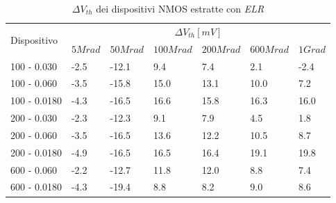\documentclass[
	a4paper,
	cleardoublepage=empty,
	headings=twolinechapter,
	numbers=autoenddot,
]{scrbook}
\begin{document}
\begin{table}[H]
  \renewcommand{\arraystretch}{1.3}
  \begin{tabular}{m{2.1cm}  m{1.1cm} m{1.3cm} m{1.5cm} m{1.5cm} m{1.5cm} m{1cm}}
    \toprule
    \multirow{2}{*}{Dispositivo} & \multicolumn{6}{c}{$\Delta V_{th} [mV] $}                                                          \\
    \cmidrule{2-7}
                                 & $5Mrad$                                   & $50Mrad$ & $100Mrad$ & $200Mrad$ & $600Mrad$ & $1Grad$ \\
    \midrule
    100 - 0.030                     & -2.5                                      & -12.1    & 9.4       & 7.4       & 2.1       & -2.4        \\
    \hline
    100 - 0.060                     & -3.5                                      & -15.8    & 15.0      & 13.1      & 10.0      & 7.2        \\
    \hline
    100 - 0.0180                    & -4.3                                      & -16.5    & 16.6      & 15.8      & 16.3      & 16.0        \\
    \hline
    200 - 0.030                     & -2.3                                      & -12.3    & 9.1       & 7.9       & 4.5       & 1.8        \\
    \hline
    200 - 0.060                     & -3.5                                      & -16.5    & 13.6      & 12.2      & 10.5      & 8.7        \\
    \hline
    200 - 0.0180                    & -4.9                                      & -16.5    & 16.5      & 16.4      & 19.1      & 19.8        \\
    \hline
    600 - 0.060                     & -2.2                                      & -12.7    & 11.8      & 12.0      & 8.8       &  7.4       \\
    \hline
    600 - 0.0180                    & -4.3                                      & -19.4    & 8.8       & 8.2       & 9.0       & 8.6        \\
    \bottomrule
  \end{tabular}
  \caption{$\Delta V_{th}$ dei dispositivi NMOS estratte con \emph{ELR}}
  \label{tab:deltaVthELRN}
\end{table}
\end{document}
